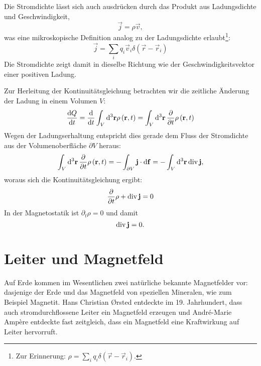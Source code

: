 Die Stromdichte lässt sich auch ausdrücken durch das Produkt aus Ladungsdichte und Geschwindigkeit,
\begin{equation*}
	\vec {j}=\rho \vec {v},
\end{equation*}
was eine mikroskopische Definition analog zu der Ladungsdichte erlaubt\footnote{Zur Erinnerung: $\rho =\sum _{i}q_{i}\delta \left(\vec {r}-\vec {r}_{i}\right)$.}:
\begin{equation*}
	\vec {j}=\sum _{i}q_{i}\vec {v}_{i}\delta \left(\vec {r}-\vec {r}_{i}\right)
\end{equation*}
Die Stromdichte zeigt damit in dieselbe Richtung wie der Geschwindigkeitsvektor einer positiven Ladung.

Zur Herleitung der Kontinuitätsgleichung betrachten wir die zeitliche Änderung der Ladung in einem Volumen $V$:
\begin{equation*}
	\frac{\diff Q}{\diff t}=\frac{\diff }{\diff t}\int _{V}\diff^{3}\vec {r}\rho \left(\vec {r},t\right)=\int _{V}\diffa[3]{\vec{r}}\frac{\partial }{\partial t}\rho \left(\vec {r},t\right)
\end{equation*}
Wegen der Ladungserhaltung entspricht dies gerade dem Fluss der Stromdichte aus der Volumenoberfläche $\partial V$ heraus:
\begin{equation*}
	\int _{V}\diffa[3]{\vec{r}}\frac{\partial }{\partial t}\rho \left(\vec {r},t\right)=-\int _{\partial V}\vec {j}\cdot \diff \vec {f}=-\int _{V}\diffa[3]{\vec{r}}\divg \vec {j},
\end{equation*}
woraus sich die Kontinuitätsgleichung ergibt:
\begin{equation*}
	\frac{\partial }{\partial t}\rho +\divg \vec {j}=0
\end{equation*}
In der Magnetostatik ist $\partial _{t}\rho =0$ und damit
\begin{equation*}
	\divg \vec {j}=0.
\end{equation*}


\section{Leiter und Magnetfeld}

Auf Erde kommen im Wesentlichen zwei natürliche bekannte Magnetfelder vor: dasjenige der Erde und das Magnetfeld von speziellen Mineralen, wie zum Beispiel Magnetit. Hans Christian \O{}rsted entdeckte im 19. Jahrhundert, dass auch stromdurchflossene Leiter ein Magnetfeld erzeugen und André-Marie Ampère entdeckte fast zeitgleich, dass ein Magnetfeld eine Kraftwirkung auf Leiter hervorruft.

